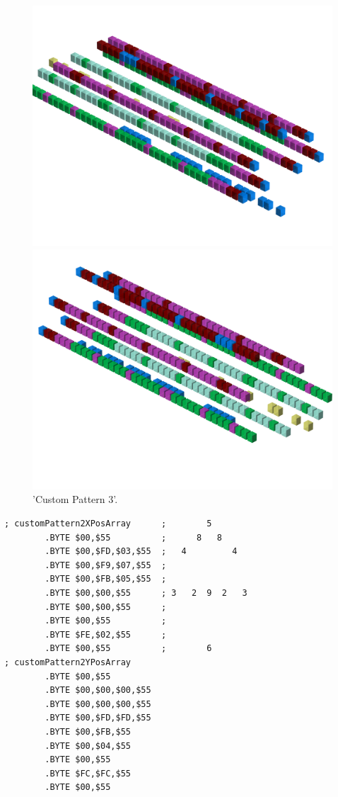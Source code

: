 \begin{figure}[H]
    \centering
    \begin{adjustbox}{width=12cm,center}
      \includegraphics[width=12cm]{src/patterns/pattern10-45.png}%
    \end{adjustbox}
    \begin{adjustbox}{width=12cm,margin=0cm -4cm}
      \includegraphics[width=12cm]{src/patterns/pattern10-225.png}%
    \end{adjustbox}
\caption{'Custom Pattern 3'.}
\end{figure}
\clearpage

\begin{lstlisting}
; customPattern2XPosArray      ;        5       
        .BYTE $00,$55          ;      8   8     
        .BYTE $00,$FD,$03,$55  ;   4         4  
        .BYTE $00,$F9,$07,$55  ;                
        .BYTE $00,$FB,$05,$55  ;                
        .BYTE $00,$00,$55      ; 3   2  9  2   3
        .BYTE $00,$00,$55      ;                
        .BYTE $00,$55          ;                
        .BYTE $FE,$02,$55      ;                
        .BYTE $00,$55          ;        6       
; customPattern2YPosArray
        .BYTE $00,$55
        .BYTE $00,$00,$00,$55
        .BYTE $00,$00,$00,$55
        .BYTE $00,$FD,$FD,$55
        .BYTE $00,$FB,$55
        .BYTE $00,$04,$55
        .BYTE $00,$55
        .BYTE $FC,$FC,$55
        .BYTE $00,$55
\end{lstlisting}


